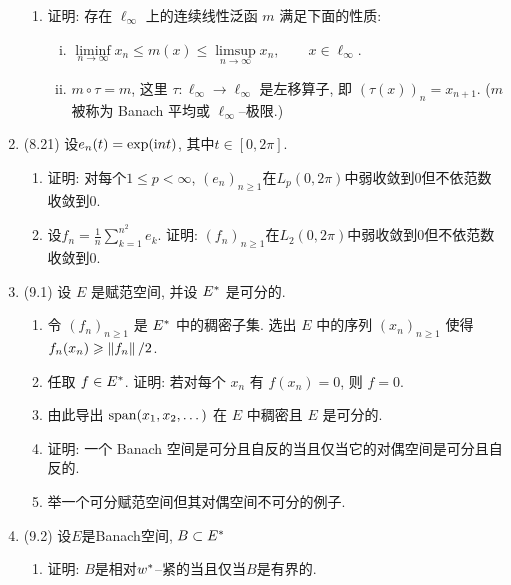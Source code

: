 \begin{enumerate}[label=\textbf{\arabic*.}, ref=\arabic*]
\begin{enumerate}[(1)]
                \item 证明: 存在 $ \ell_{\infty} $ 上的连续线性泛函 $ m $ 满足下面的性质:
                \begin{enumerate}[(i)]
                    \item $ \liminf\limits_{n\to\infty}x_{n}\leqslant m(x)\leqslant\limsup\limits_{n\to\infty}x_{n}, \qquad x\in\ell_{\infty} $.
                    \item $ m\circ \tau=m $, 这里 $ \tau: \ell_{\infty}\to\ell_{\infty} $ 是左移算子, 即 $ (\tau(x))_{n}=x_{n+1} $. ($ m $ 被称为 Banach 平均或 $ \ell_{\infty} $--极限.)
                \end{enumerate}
            \end{enumerate}
        \item (8.21) 设$ e_n(t)=\exp(\mathrm{i} nt) $, 其中$ t\in[0,2\pi] $.
        \begin{enumerate}[(1)]
            \item 证明: 对每个$ 1\leqslant p<\infty $, $ (e_n)_{n\geqslant 1} $在$ L_p(0,2\pi) $中弱收敛到0但不依范数收敛到0.
            \item 设$ f_n=\frac{1}{n}\sum\limits_{k=1}^{n^2}e_k $. 证明: $ (f_n)_{n\geqslant 1} $在$ L_2(0,2\pi) $中弱收敛到0但不依范数收敛到0.
        \end{enumerate}
        \item (9.1) 设 $ E $ 是赋范空间, 并设 $ E^{*} $ 是可分的.
        \begin{enumerate}[(1)]
            \item 令 $ (f_{n})_{n\geqslant1} $ 是 $ E^{*} $ 中的稠密子集. 选出 $ E $ 中的序列 $ (x_{n})_{n\geqslant1} $ 使得 $ f_{n}(x_{n})\geqslant \left\| f_{n} \right\|/2 $.
            \item 任取 $ f\in E^{*} $. 证明: 若对每个 $ x_{n} $ 有 $ f(x_{n})=0 $, 则 $ f=0 $. 
            \item 由此导出 $ \operatorname{span}(x_{1}, x_{2}, \dots) $ 在 $ E $ 中稠密且 $ E $ 是可分的.
            \item 证明: 一个 Banach 空间是可分且自反的当且仅当它的对偶空间是可分且自反的.
            \item 举一个可分赋范空间但其对偶空间不可分的例子. 
        \end{enumerate}
        \item (9.2) 设$ E $是Banach空间, $ B\subset E^{*} $
        \begin{enumerate}[(1)]
            \item 证明: $ B $是相对$ w^{*} $--紧的当且仅当$ B $是有界的.

\end{enumerate}
\end{enumerate}
